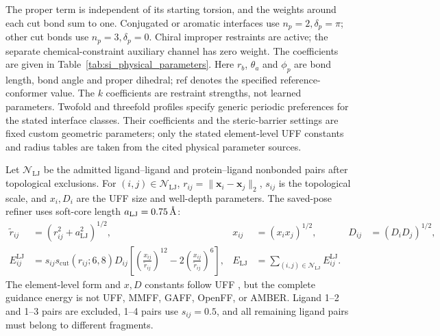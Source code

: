 \documentclass{article}
\newcommand{\angstrom}{\text{\normalfont\AA}}
\newcommand{\citep}[1]{\cite{#1}}
\begin{document}
The proper term is independent of its starting torsion, and the weights around each cut bond sum to one. Conjugated or aromatic interfaces use \(n_p=2,\delta_p=\pi\); other cut bonds use \(n_p=3,\delta_p=0\). Chiral improper restraints are active; the separate chemical-constraint auxiliary channel has zero weight. The coefficients are given in Table~\ref{tab:si_physical_parameters}.
Here \(r_b\), \(\theta_a\) and \(\phi_p\) are bond length, bond angle and proper dihedral; ref denotes the specified reference-conformer value. The \(k\) coefficients are restraint strengths, not learned parameters. Twofold and threefold profiles specify generic periodic preferences for the stated interface classes. Their coefficients and the steric-barrier settings are fixed custom geometric parameters; only the stated element-level UFF constants and radius tables are taken from the cited physical parameter sources.

Let \(\mathcal N_{\mathrm{LJ}}\) be the admitted ligand--ligand and protein--ligand nonbonded pairs after topological exclusions.
For \((i,j)\in\mathcal N_{\mathrm{LJ}}\), \(r_{ij}=\|\mathbf x_i-\mathbf x_j\|_2\), \(s_{ij}\) is the topological scale, and \(x_i,D_i\) are the UFF size and well-depth parameters.
The saved-pose refiner uses soft-core length \(a_{\mathrm{LJ}}=0.75\,\angstrom\):
\begin{align}
    \widetilde r_{ij}&=(r_{ij}^2+a_{\mathrm{LJ}}^2)^{1/2},&
    x_{ij}&=(x_ix_j)^{1/2},&
    D_{ij}&=(D_iD_j)^{1/2},\\
    E_{ij}^{\mathrm{LJ}}
    &=s_{ij}s_{\mathrm{cut}}(r_{ij};6,8)D_{ij}
      \left[
      \left(\frac{x_{ij}}{\widetilde r_{ij}}\right)^{12}
      -2\left(\frac{x_{ij}}{\widetilde r_{ij}}\right)^6
      \right],&
    E_{\mathrm{LJ}}
    &=\sum_{(i,j)\in\mathcal N_{\mathrm{LJ}}}E_{ij}^{\mathrm{LJ}}.
    \label{eq:si_lj}
\end{align}
The element-level form and \(x,D\) constants follow UFF \citep{rappe1992uff}, but the complete guidance energy is not UFF, MMFF, GAFF, OpenFF, or AMBER.
Ligand 1--2 and 1--3 pairs are excluded, 1--4 pairs use \(s_{ij}=0.5\), and all remaining ligand pairs must belong to different fragments.
\end{document}
